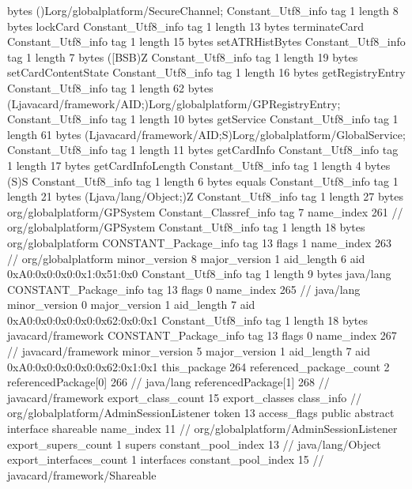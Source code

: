 {{{			bytes	()Lorg/globalplatform/SecureChannel;
		}
		Constant_Utf8_info {
			tag	1
			length	8
			bytes	lockCard
		}
		Constant_Utf8_info {
			tag	1
			length	13
			bytes	terminateCard
		}
		Constant_Utf8_info {
			tag	1
			length	15
			bytes	setATRHistBytes
		}
		Constant_Utf8_info {
			tag	1
			length	7
			bytes	([BSB)Z
		}
		Constant_Utf8_info {
			tag	1
			length	19
			bytes	setCardContentState
		}
		Constant_Utf8_info {
			tag	1
			length	16
			bytes	getRegistryEntry
		}
		Constant_Utf8_info {
			tag	1
			length	62
			bytes	(Ljavacard/framework/AID;)Lorg/globalplatform/GPRegistryEntry;
		}
		Constant_Utf8_info {
			tag	1
			length	10
			bytes	getService
		}
		Constant_Utf8_info {
			tag	1
			length	61
			bytes	(Ljavacard/framework/AID;S)Lorg/globalplatform/GlobalService;
		}
		Constant_Utf8_info {
			tag	1
			length	11
			bytes	getCardInfo
		}
		Constant_Utf8_info {
			tag	1
			length	17
			bytes	getCardInfoLength
		}
		Constant_Utf8_info {
			tag	1
			length	4
			bytes	(S)S
		}
		Constant_Utf8_info {
			tag	1
			length	6
			bytes	equals
		}
		Constant_Utf8_info {
			tag	1
			length	21
			bytes	(Ljava/lang/Object;)Z
		}
		Constant_Utf8_info {
			tag	1
			length	27
			bytes	org/globalplatform/GPSystem
		}
		Constant_Classref_info {
			tag	7
			name_index	261		// org/globalplatform/GPSystem
		}
		Constant_Utf8_info {
			tag	1
			length	18
			bytes	org/globalplatform
		}
		CONSTANT_Package_info {
			tag	13
			flags	1
			name_index	263		// org/globalplatform
			minor_version	8
			major_version	1
			aid_length	6
			aid	0xA0:0x0:0x0:0x1:0x51:0x0
		}
		Constant_Utf8_info {
			tag	1
			length	9
			bytes	java/lang
		}
		CONSTANT_Package_info {
			tag	13
			flags	0
			name_index	265		// java/lang
			minor_version	0
			major_version	1
			aid_length	7
			aid	0xA0:0x0:0x0:0x0:0x62:0x0:0x1
		}
		Constant_Utf8_info {
			tag	1
			length	18
			bytes	javacard/framework
		}
		CONSTANT_Package_info {
			tag	13
			flags	0
			name_index	267		// javacard/framework
			minor_version	5
			major_version	1
			aid_length	7
			aid	0xA0:0x0:0x0:0x0:0x62:0x1:0x1
		}
	}
	this_package	264
	referenced_package_count	2
	referencedPackage[0]	266		// java/lang
	referencedPackage[1]	268		// javacard/framework
	export_class_count	15
	export_classes {
		class_info {		// org/globalplatform/AdminSessionListener
			token	13
			access_flags	public abstract interface shareable
			name_index	11		// org/globalplatform/AdminSessionListener
			export_supers_count	1
			supers {
				constant_pool_index	13		// java/lang/Object
			}
			export_interfaces_count	1
			interfaces {
				constant_pool_index	15		// javacard/framework/Shareable
}}}}
